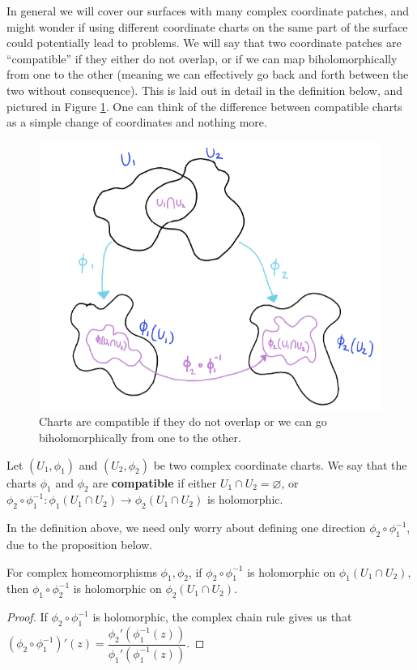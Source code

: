In general we will cover our surfaces with many complex coordinate patches, and might wonder if using different coordinate charts on the same part of the surface could potentially lead to problems. We will say that two coordinate patches are ``compatible'' if they either do not overlap, or if we can map biholomorphically from one to the other (meaning we can effectively go back and forth between the two without consequence). This is laid out in detail in the definition below, and pictured in Figure \ref{fig:1.2}. One can think of the difference between compatible charts as a simple change of coordinates and nothing more.
\begin{figure}[H]\begin{center}\includegraphics[scale=0.8]{Images/compatibility.png}\end{center}\caption{Charts are compatible if they do not overlap or we can go biholomorphically from one to the other.}\label{fig:1.2}\end{figure}

\begin{definition} Let $(U_1,\phi_1)$ and $(U_2,\phi_2)$ be two complex coordinate charts. We say that the charts $\phi_1$ and $\phi_2$ are \textbf{\textcolor{myblue}{compatible}} if either $U_1\cap U_2=\varnothing$, or $\phi_2\circ\phi_1^{-1}:\phi_1(U_1\cap U_2)\to \phi_2(U_1\cap U_2)$ is holomorphic.
\end{definition}

In the definition above, we need only worry about defining one direction $\phi_2\circ\phi_1^{-1}$, due to the proposition below.
\begin{prop}
    For complex homeomorphisms $\phi_1,\phi_2$, if $\phi_2\circ\phi_1^{-1}$ is holomorphic on $\phi_1(U_1\cap U_2)$, then $\phi_1\circ\phi_2^{-1}$ is holomorphic on $\phi_2(U_1\cap U_2)$. \begin{proof}If $\phi_2\circ\phi_1^{-1}$ is holomorphic, the complex chain rule gives us that $(\phi_2\circ\phi_1^{-1})'(z)=\dfrac{\phi_2'(\phi_1^{-1}(z))}{\phi_1'(\phi_1^{-1}(z))}$.\end{proof}
\end{prop}

